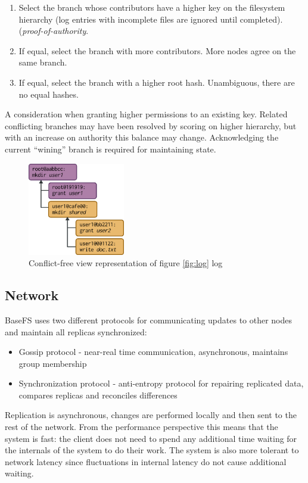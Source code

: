 \documentclass{sig-alternate}
\begin{document}
\begin{enumerate}
\item Select the branch whose contributors have a higher key on the filesystem hierarchy (log entries with incomplete files are ignored until completed). (\textit{proof-of-authority}.
\item If equal, select the branch with more contributors. More nodes agree on the same branch.
\item If equal, select the branch with a higher root hash. Unambiguous, there are no equal hashes.
\end{enumerate}

A consideration when granting higher permissions to an existing key. Related conflicting branches may have been resolved by scoring on higher hierarchy, but with an increase on authority this balance may change. Acknowledging the current ``wining'' branch is required for maintaining state.

\begin{figure}
\centering
\includegraphics[width=120pt]{imgs/view.png}
\caption{Conflict-free view representation of figure \ref{fig:log} log}
\label{fig:view}
\end{figure}


\subsection{Network} \label{network}

BaseFS uses two different protocols for communicating updates to other nodes and maintain all replicas synchronized:

\begin{itemize}
    \item Gossip protocol - near-real time communication, asynchronous, maintains group membership
    \item Synchronization protocol - anti-entropy protocol for repairing replicated data, compares replicas and reconciles differences
\end{itemize}

Replication is asynchronous, changes are performed locally and then sent to the rest of the network. From the performance perspective this means that the system is fast: the client does not need to spend any additional time waiting for the internals of the system to do their work. The system is also more tolerant to network latency since fluctuations in internal latency do not cause additional waiting.
\end{document}
